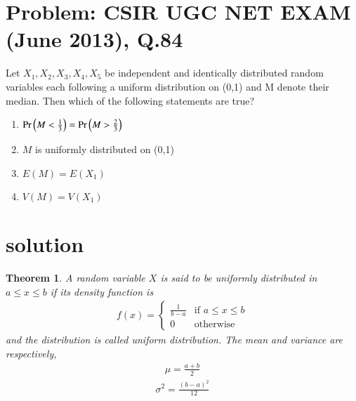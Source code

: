 \documentclass[journal,12pt,twocolumn]{IEEEtran}
\newtheorem{theorem}{Theorem}[section]
\begin{document}
\section*{Problem: CSIR UGC NET EXAM (June 2013), Q.84}
Let $X_1,X_2,X_3,X_4,X_5$ be independent and identically distributed random variables each following a uniform distribution on (0,1) and M denote their median. Then which of the following statements are true?
\begin{enumerate}
    \item $\Pr\left(M<\frac{1}{3}\right)=\Pr\left(M>\frac{2}{3}\right)$\\
    \item $M$ is uniformly distributed on (0,1)\\
    \item $E(M)=E(X_1)$\\
    \item $V(M)=V(X_1)$
\end{enumerate}
\section*{solution}
\begin{theorem}
A random variable $X$ is said to be uniformly distributed in $a\leq x\leq b$ if its density function is
\begin{align}
    f(x)=
    \begin{cases}
    \frac{1}{b-a} & \text{if } a\leq x \leq b\\
    0 & \text{otherwise}
    \end{cases}\label{eq:1}
\end{align}
and the distribution is called uniform distribution.
The mean and variance are respectively,
\begin{align}
    \mu=\frac{a+b}{2}\label{eq:2}
\end{align}
\begin{align}
     \sigma^2=\frac{(b-a)^2}{12}\label{eq:3}
\end{align}
\label{theorem}
\end{theorem}
\end{document}
